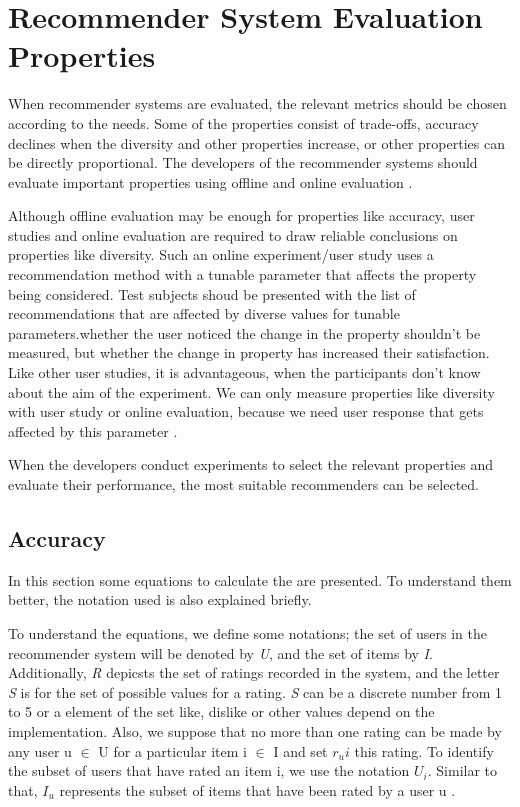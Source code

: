 
\section{Recommender System Evaluation Properties}\label{section:evaluation_metrics}

When recommender systems are evaluated, the relevant metrics should be chosen according to the needs. Some of the properties consist of trade-offs, accuracy declines when the diversity and other properties increase, or other properties can be directly proportional. The developers of the recommender systems should evaluate important properties using offline and online evaluation \cite{shani2011evaluating}.

Although offline evaluation may be enough for properties like accuracy, user studies and online evaluation are required to draw reliable conclusions on properties like diversity. Such an online experiment/user study uses a recommendation method with a tunable parameter that affects the property being considered. Test subjects shoud be presented with the list of recommendations that are affected by diverse values for tunable parameters.whether the user noticed the change in the property shouldn't be measured, but whether the change in property has increased their satisfaction. Like other user studies, it is advantageous, when the participants don't know about the aim of the experiment. We can only measure properties like diversity with user study or online evaluation, because we need user response that gets affected by this parameter \cite{shani2011evaluating}.

When the developers conduct experiments to select the relevant properties and evaluate their performance, the most suitable recommenders can be selected.

\subsection{Accuracy}

In this section some equations to calculate the are presented. To understand them better, the notation used is also explained briefly. 

To understand the equations, we define some notations; the set of users in the recommender system will be denoted by \textit{U}, and the set of items by \textit{I}. Additionally, \textit{R} depicsts the set of ratings recorded in the system, and the letter \textit{S} is for the set of possible values for a rating. \textit{S} can be a discrete number from 1 to 5 or a element of the set {like, dislike} or other values depend on the implementation. Also, we suppose that no more than one rating can be made by any user u $\in$  U for a particular item i $\in$ I and set $r_ui$ this rating. To identify the subset of users that have rated an item i, we use the notation $U_i$. Similar to that, $I_u$ represents the subset of items that have been rated by a user u \cite{shani2011evaluating}.

